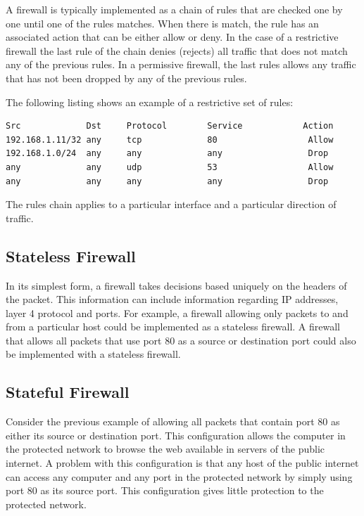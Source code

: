 A firewall is typically implemented as a chain of rules that are checked one by one until one of the rules matches.
When there is match, the rule has an associated action that can be either allow or deny.
In the case of a restrictive firewall the last rule of the chain denies (rejects) all traffic that does not match any of the previous rules.
In a permissive firewall, the last rules allows any traffic that has not been dropped by any of the previous rules.

The following listing shows an example of a restrictive set of rules:
\begin{lstlisting}
Src             Dst     Protocol        Service            Action
192.168.1.11/32 any     tcp             80                  Allow
192.168.1.0/24  any     any             any                 Drop
any             any     udp             53                  Allow
any             any     any             any                 Drop
\end{lstlisting}

The rules chain applies to a particular interface and a particular direction of traffic.

\subsection{Stateless Firewall}

In its simplest form, a firewall takes decisions based uniquely on the headers of the packet.
This information can include information regarding IP addresses, layer 4 protocol and ports.
For example, a firewall allowing only packets to and from a particular host could be implemented as a stateless firewall.
A firewall that allows all packets that use port 80 as a source or destination port could also be implemented with a stateless firewall.

\subsection{Stateful Firewall}

Consider the previous example of allowing all packets that contain port 80 as either its source or destination port.
This configuration allows the computer in the protected network to browse the web available in servers of the public internet.
A problem with this configuration is that any host of the public internet can access any computer and any port in the protected network by simply using port 80 as its source port.
This configuration gives little protection to the protected network.

